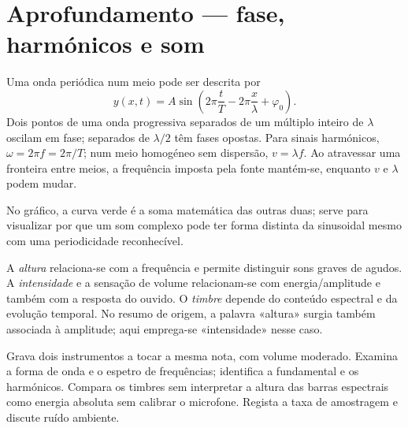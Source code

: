 \documentclass[11pt,a4paper,oneside]{book}
\begin{document}
\section{Aprofundamento — fase, harmónicos e som}
Uma onda periódica num meio pode ser descrita por
\[
y(x,t)=A\sin\!\left(2\pi\frac{t}{T}
             -2\pi\frac{x}{\lambda}+\varphi_0\right).
\]
Dois pontos de uma onda progressiva separados de um múltiplo
inteiro de $\lambda$ oscilam em fase; separados de
$\lambda/2$ têm fases opostas. Para sinais harmónicos,
$\omega=2\pi f=2\pi/T$; num meio homogéneo sem dispersão,
$v=\lambda f$. Ao atravessar uma fronteira entre meios, a
frequência imposta pela fonte mantém-se, enquanto $v$ e
$\lambda$ podem mudar.
\begin{center}
\end{center}
No gráfico, a curva verde é a soma matemática das outras duas;
serve para visualizar por que um som complexo pode ter forma
distinta da sinusoidal mesmo com uma periodicidade reconhecível.
\begin{nota}
A \emph{altura} relaciona-se com a frequência e permite distinguir
sons graves de agudos. A \emph{intensidade} e a sensação de volume
relacionam-se com energia/amplitude e também com a resposta do
ouvido. O \emph{timbre} depende do conteúdo espectral e da evolução
temporal. No resumo de origem, a palavra «altura» surgia também
associada à amplitude; aqui emprega-se «intensidade» nesse caso.
\end{nota}
\begin{atividade}[title=Do diapasão ao espetro sonoro]
Grava dois instrumentos a tocar a mesma nota, com volume moderado.
Examina a forma de onda e o espetro de frequências; identifica a
fundamental e os harmónicos. Compara os timbres sem interpretar
a altura das barras espectrais como energia absoluta sem calibrar
o microfone. Regista a taxa de amostragem e discute ruído ambiente.
\end{atividade}
\end{document}
